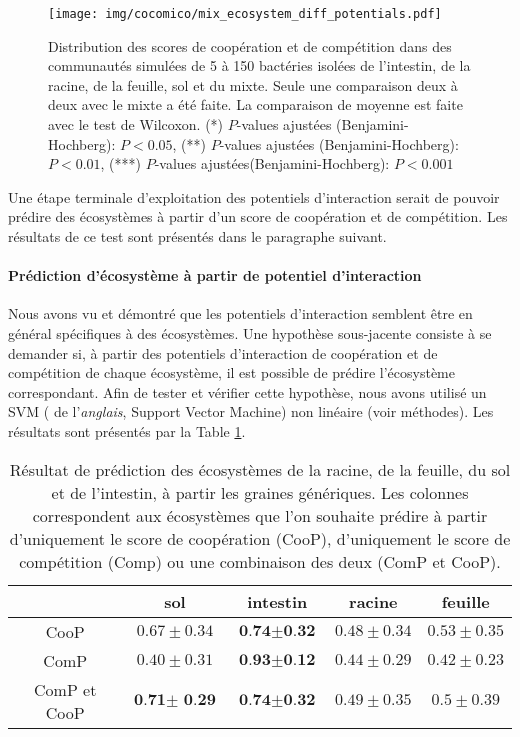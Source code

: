 \documentclass[../main.tex]{subfiles}
\begin{document}
\begin{figure}[H]
    \centering
    \texttt{[image: img/cocomico/mix\_ecosystem\_diff\_potentials.pdf]}
    \caption{Distribution des scores de coopération et de compétition dans des communautés simulées de 5 à 150 bactéries isolées de l'intestin, de la racine, de la feuille, sol et du mixte. Seule une comparaison deux à deux avec le mixte a été faite. La comparaison de moyenne est faite avec le test de Wilcoxon. (*)  $P$-values ajustées (Benjamini-Hochberg): $P < 0.05$,
    (**) $P$-values ajustées (Benjamini-Hochberg): $P < 0.01$,
    (***) $P$-values ajustées(Benjamini-Hochberg): $P < 0.001$}
    \label{fig:mix-diff-potentials}
\end{figure}



Une étape terminale d'exploitation des potentiels d'interaction serait de pouvoir prédire des écosystèmes à partir d'un score de coopération et de compétition. Les résultats de ce test sont présentés dans le paragraphe suivant.

\paragraph*{Prédiction d'écosystème à partir de potentiel d'interaction}
Nous avons vu et démontré que les potentiels d'interaction semblent être en général spécifiques à des écosystèmes. Une hypothèse sous-jacente consiste à se demander si, à partir des potentiels d'interaction de coopération et de compétition de chaque écosystème, il est possible de prédire l'écosystème correspondant. Afin de tester et vérifier cette hypothèse, nous avons utilisé un SVM ( de l'\textit{anglais}, Support Vector Machine) non linéaire (voir méthodes). Les résultats sont présentés par la Table \ref{table:SVM}.



\begin{table}[h!]
\centering
\begin{adjustbox}{width=1\textwidth}
\begin{tabular}{|c|c|c|c|c|}
\hline
 & sol & intestin & racine & feuille\\
\hline
CooP & $0.67\pm 0.34$ & $\textbf{0.74}\pm \textbf{0.32}$ & $0.48\pm 0.34$& $0.53\pm 0.35$ \\
ComP & $0.40\pm 0.31$ & $\textbf{0.93}\pm \textbf{0.12}$ &$0.44\pm 0.29$ & $0.42\pm 0.23$\\
ComP et CooP & $\textbf{0.71}\pm\textbf{ 0.29}$ & $\textbf{0.74}\pm \textbf{0.32}$ & $0.49\pm 0.35$&$0.5\pm 0.39$\\

 \hline
\end{tabular}
\end{adjustbox}
\caption{Résultat de prédiction des écosystèmes de la racine, de la feuille, du sol et de l'intestin, à partir les graines génériques. Les colonnes correspondent aux écosystèmes que l'on souhaite prédire à partir d'uniquement le score de coopération (CooP), d'uniquement le score de compétition (Comp) ou une combinaison des deux (ComP et CooP).}
\label{table:SVM}
\end{table}
\end{document}
